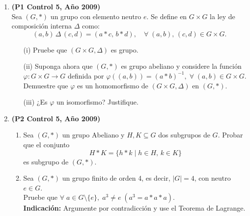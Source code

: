 \documentclass[11pt]{article}
\theoremstyle{plain}
\theoremstyle{definition}
\begin{document}
\begin{enumerate}
\item \textbf{(P1 Control 5, Año 2009)}\\
Sea $(G,*)$ un grupo con elemento neutro $e$. Se define en $G\times G$ la ley de composición interna $\Delta$ como:
$$(a,b)\,\Delta\,(c,d)=(a*c,\,b*d), \quad \forall\;(a,b),\,(c,d)\in G\times G.$$
\begin{enumerate}
\item[(i)] Pruebe que $(G\times G, \Delta)$ es grupo.
\item[(ii)] Suponga ahora que $(G,*)$ es grupo abeliano y considere la función $\varphi:G\times G \longrightarrow G$ definida por $\varphi((a,b))=(a*b)^{-1},\; \forall\;(a,b)\in G\times G$. \\
Demuestre que $\varphi$ es un homomorfismo de $(G\times G, \Delta)$ en $(G,*)$.
\item[(iii)] ¿Es $\varphi$ un isomorfismo? Justifique.
\end{enumerate}

\item \textbf{(P2 Control 5, Año 2009)}
\begin{enumerate}
\item Sea $(G,*)$ un grupo Abeliano y $H,K\subseteq G$ dos subgrupos de $G$. Probar que el conjunto
$$H*K=\{h*k\;|\;h\in H,\,k\in K\}$$
es subgrupo de $(G,*)$.
\item Sea $(G,*)$ un grupo finito de orden 4, es decir, $|G|=4$, con neutro $e\in G$.\\ 
Pruebe que $\forall\;a\in G\setminus\{e\},\; a^{3}\neq e\; (a^{3}=a*a*a)$.\\
\textbf{Indicación:} Argumente por contradicción y use el Teorema de Lagrange.
\end{enumerate}


\end{enumerate}
\end{document}
